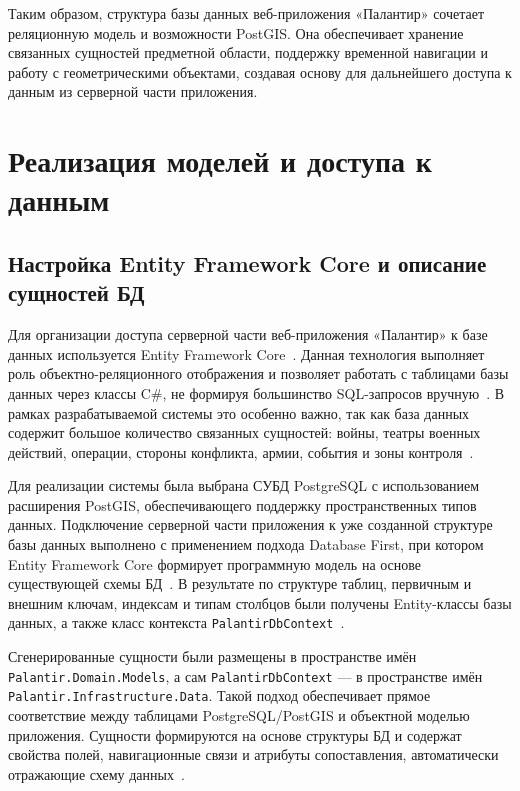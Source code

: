 Таким образом, структура базы данных веб-приложения «Палантир» сочетает реляционную модель и возможности PostGIS. Она обеспечивает хранение связанных сущностей предметной области, поддержку временной навигации и работу с геометрическими объектами, создавая основу для дальнейшего доступа к данным из серверной части приложения.

\section{Реализация моделей и доступа к данным}

\subsection{Настройка Entity Framework Core и описание сущностей БД}

Для организации доступа серверной части веб-приложения «Палантир» к базе данных используется Entity Framework Core~\cite{efcore_overview}. 
Данная технология выполняет роль объектно-реляционного отображения и позволяет работать с таблицами базы данных через классы C\#, не формируя большинство SQL-запросов вручную~\cite{csharp_docs}. В рамках разрабатываемой системы это особенно важно, так как база данных содержит большое количество связанных сущностей: войны, театры военных действий, операции, стороны конфликта, армии, события и зоны контроля~\cite{smith_efcore_in_action}.

Для реализации системы была выбрана СУБД PostgreSQL с использованием расширения PostGIS, обеспечивающего поддержку пространственных типов данных. Подключение серверной части приложения к уже созданной структуре базы данных выполнено с применением подхода Database First, при котором Entity Framework Core формирует программную модель на основе существующей схемы БД~\cite{efcore_scaffolding}. 
В результате по структуре таблиц, первичным и внешним ключам, индексам и типам столбцов были получены Entity-классы базы данных, а также класс контекста \texttt{PalantirDbContext}~\cite{efcore_overview}.

Сгенерированные сущности были размещены в пространстве имён \texttt{Palantir.Domain.Models}, а сам \texttt{PalantirDbContext} --- в пространстве имён \texttt{Palantir.Infrastructure.Data}. Такой подход обеспечивает прямое соответствие между таблицами PostgreSQL/PostGIS и объектной моделью приложения. Сущности формируются на основе структуры БД и содержат свойства полей, навигационные связи и атрибуты сопоставления, автоматически отражающие схему данных~\cite{smith_efcore_in_action}.


